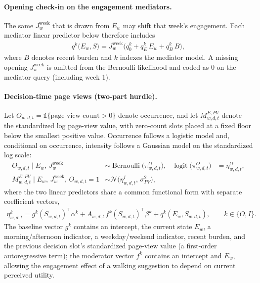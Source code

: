 \paragraph{Opening check-in on the engagement mediators.}
The same $J_w^{\mathrm{week}}$ that is drawn from $E_w$ may shift that week's
engagement. Each mediator linear predictor below therefore includes
\begin{align}
q^{k}\bigl(E_w, S\bigr)
=
J_{w}^{\mathrm{week}}
\bigl(
q_0^{k} + q_E^{k}\, E_w + q_B^{k}\, B
\bigr),
\label{eq:pu-jw}
\end{align}
where $B$ denotes recent burden and $k$ indexes the mediator model. A missing
opening $J_w^{\mathrm{week}}$ is omitted from the Bernoulli likelihood and
coded as 0 on the mediator query (including week 1).

\paragraph{Decision-time page views (two-part hurdle).}
Let $O_{w,d,t} = \mathbb{1}\{\text{page-view count} > 0\}$ denote occurrence,
and let $M_{w,d,t}^{E,PV}$ denote the standardized log page-view value, with
zero-count slots placed at a fixed floor below the smallest positive value.
Occurrence follows a logistic model and, conditional on occurrence, intensity
follows a Gaussian model on the standardized log scale:
\begin{align}
O_{w,d,t} \mid E_w,\, J_w^{\mathrm{week}}
&\sim
\operatorname{Bernoulli}\!\bigl(\pi_{w,d,t}^{O}\bigr),
&
\operatorname{logit}\bigl(\pi_{w,d,t}^{O}\bigr)
&=
\eta_{w,d,t}^{O},
\nonumber\\
M_{w,d,t}^{E,PV} \mid E_w,\, J_w^{\mathrm{week}},\, O_{w,d,t} = 1
&\sim
\mathcal{N}\!\bigl(\eta_{w,d,t}^{I},\, \sigma_{PV}^2\bigr),
\label{eq:pu-pv-model}
\end{align}
where the two linear predictors share a common functional form with separate
coefficient vectors,
\begin{align}
\eta_{w,d,t}^{k}
=
g^{k}(S_{w,d,t})^\top \alpha^{k}
+
A_{w,d,t}\, f^{k}(S_{w,d,t})^\top \beta^{k}
+
q^{k}(E_w, S_{w,d,t}),
\qquad k \in \{O, I\}.
\end{align}
The baseline vector $g^{k}$ contains an intercept, the current state $E_w$, a
morning/afternoon indicator, a weekday/weekend indicator, recent burden, and
the previous decision slot's standardized page-view value (a first-order
autoregressive term); the moderator vector $f^{k}$ contains an intercept and
$E_w$, allowing the engagement effect of a walking suggestion to depend on
current perceived utility.

